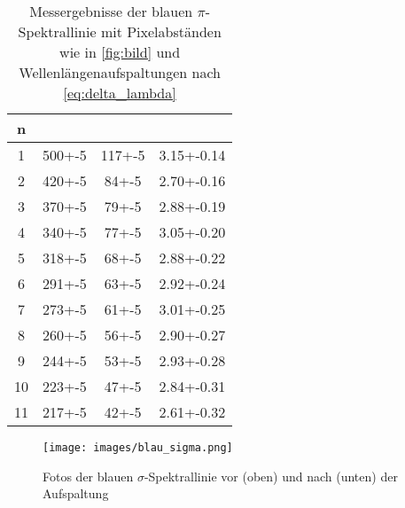 \begin{table}[ht]
    \centering
    \caption{Messergebnisse der blauen $\pi$-Spektrallinie mit Pixelabständen wie in \autoref{fig:bild} und Wellenlängenaufspaltungen nach \autoref{eq:delta_lambda}}
    \label{tab:blau_pi}
    \begin{tabular}{S[table-format=1.0] S[table-format=3.0(1)] S[table-format=3.0(1)] S[table-format=1.2(3)]}
        \toprule
        n &  & & \tableSI{\delta \lambda}{\pico\meter}  \\
         & 500+-5 & 117+-5 & 3.15+-0.14 \\
        2 & 420+-5 & 84+-5 & 2.70+-0.16 \\
        3 & 370+-5 & 79+-5 & 2.88+-0.19 \\
        4 & 340+-5 & 77+-5 & 3.05+-0.20 \\
        5 & 318+-5 & 68+-5 & 2.88+-0.22 \\
        6 & 291+-5 & 63+-5 & 2.92+-0.24 \\
        7 & 273+-5 & 61+-5 & 3.01+-0.25 \\
        8 & 260+-5 & 56+-5 & 2.90+-0.27 \\
        9 & 244+-5 & 53+-5 & 2.93+-0.28 \\
        10 & 223+-5 & 47+-5 & 2.84+-0.31 \\
        11 & 217+-5 & 42+-5 & 2.61+-0.32 \\
        \bottomrule
    \end{tabular}
\end{table}

\begin{figure}[ht]
    \centering
    \texttt{[image: images/blau\_sigma.png]}
    \caption{Fotos der blauen $\sigma$-Spektrallinie vor (oben) und nach (unten) der Aufspaltung}
    \label{fig:blau_sigma}
\end{figure}

